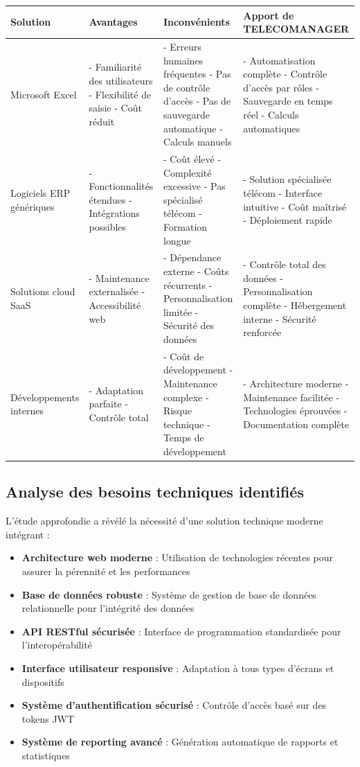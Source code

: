 \documentclass[12pt,a4paper]{report}
\begin{document}
\begin{longtable}{|p{3cm}|p{4cm}|p{4cm}|p{4cm}|}
\hline
\textbf{Solution} & \textbf{Avantages} & \textbf{Inconvénients} & \textbf{Apport de TELECOMANAGER} \\
\hline
Microsoft Excel & 
- Familiarité des utilisateurs
- Flexibilité de saisie
- Coût réduit & 
- Erreurs humaines fréquentes
- Pas de contrôle d'accès
- Pas de sauvegarde automatique
- Calculs manuels & 
- Automatisation complète
- Contrôle d'accès par rôles
- Sauvegarde en temps réel
- Calculs automatiques \\
\hline
Logiciels ERP génériques & 
- Fonctionnalités étendues
- Intégrations possibles & 
- Coût élevé
- Complexité excessive
- Pas spécialisé télécom
- Formation longue & 
- Solution spécialisée télécom
- Interface intuitive
- Coût maîtrisé
- Déploiement rapide \\
\hline
Solutions cloud SaaS & 
- Maintenance externalisée
- Accessibilité web & 
- Dépendance externe
- Coûts récurrents
- Personnalisation limitée
- Sécurité des données & 
- Contrôle total des données
- Personnalisation complète
- Hébergement interne
- Sécurité renforcée \\
\hline
Développements internes & 
- Adaptation parfaite
- Contrôle total & 
- Coût de développement
- Maintenance complexe
- Risque technique
- Temps de développement & 
- Architecture moderne
- Maintenance facilitée
- Technologies éprouvées
- Documentation complète \\
\hline
\end{longtable}

\subsection{Analyse des besoins techniques identifiés}

L'étude approfondie a révélé la nécessité d'une solution technique moderne intégrant :

\begin{itemize}
\item \textbf{Architecture web moderne} : Utilisation de technologies récentes pour assurer la pérennité et les performances
\item \textbf{Base de données robuste} : Système de gestion de base de données relationnelle pour l'intégrité des données
\item \textbf{API RESTful sécurisée} : Interface de programmation standardisée pour l'interopérabilité
\item \textbf{Interface utilisateur responsive} : Adaptation à tous types d'écrans et dispositifs
\item \textbf{Système d'authentification sécurisé} : Contrôle d'accès basé sur des tokens JWT
\item \textbf{Système de reporting avancé} : Génération automatique de rapports et statistiques
\end{itemize}
\end{document}
